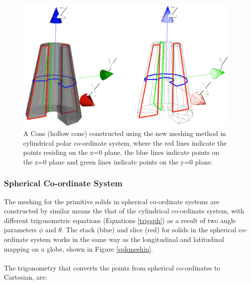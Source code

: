 \documentclass[12pt,a4paper]{article}
\begin{document}
\begin{figure}[h!]
\centering
\includegraphics[scale=0.3]{Images//Coords//consco.png}
\caption[width=\columnwidth]{A Cons (hollow cone) constructed using the new meshing method in cylindrical polar co-ordinate system, where the red lines indicate the points residing on the x=0 plane, the blue lines indicate points on the z=0 plane and green lines indicate points on the y=0 plane.}
\label{consco}
\end{figure}


\subsubsection{Spherical Co-ordinate System}

The meshing for the primitive solids in spherical co-ordinate systems are constructed by similar means the that of the cylindrical co-ordinate system, with different trigonometric equations (Equations \ref{trigsph}) as a result of two angle parameters $\phi$ and $\theta$. The stack (blue) and slice (red) for solids in the spherical co-ordinate system works in the same way as the longitudinal and latitudinal mapping on a globe, shown in Figure \ref{sphmeshin}. 
\\\\
The trigonometry that converts the points from spherical co-ordinates to Cartesian, are:
\end{document}
